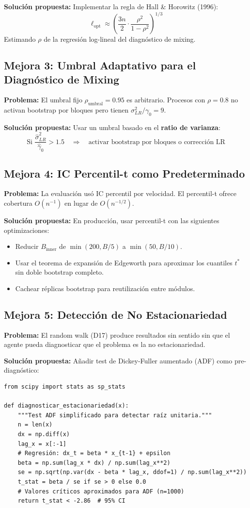 \documentclass[12pt,a4paper]{article}
\begin{document}
\textbf{Solución propuesta:} Implementar la regla de Hall \& Horowitz (1996):
\[
\ell_{\text{opt}} \approx \left( \frac{3n}{2} \cdot \frac{\rho^2}{1-\rho^2} \right)^{1/3}
\]
Estimando $\rho$ de la regresión log-lineal del diagnóstico de mixing.

\subsection{Mejora 3: Umbral Adaptativo para el Diagnóstico de Mixing}

\textbf{Problema:} El umbral fijo $\rho_{\text{umbral}} = 0.95$ es arbitrario. Procesos con $\rho = 0.8$ no activan bootstrap por bloques pero tienen $\sigma^2_{LR} / \gamma_0 = 9$.

\textbf{Solución propuesta:} Usar un umbral basado en el \textbf{ratio de varianza}:
\[
\text{Si } \frac{\hat{\sigma}^2_{LR}}{\hat{\gamma}_0} > 1.5 \quad \Rightarrow \quad \text{activar bootstrap por bloques o corrección LR}
\]

\subsection{Mejora 4: IC Percentil-t como Predeterminado}

\textbf{Problema:} La evaluación usó IC percentil por velocidad. El percentil-t ofrece cobertura $O(n^{-1})$ en lugar de $O(n^{-1/2})$.

\textbf{Solución propuesta:} En producción, usar percentil-t con las siguientes optimizaciones:
\begin{itemize}
    \item Reducir $B_{\text{inner}}$ de $\min(200, B/5)$ a $\min(50, B/10)$.
    \item Usar el teorema de expansión de Edgeworth para aproximar los cuantiles $t^*$ sin doble bootstrap completo.
    \item Cachear réplicas bootstrap para reutilización entre módulos.
\end{itemize}

\subsection{Mejora 5: Detección de No Estacionariedad}

\textbf{Problema:} El random walk (D17) produce resultados sin sentido sin que el agente pueda diagnosticar que el problema es la no estacionariedad.

\textbf{Solución propuesta:} Añadir test de Dickey-Fuller aumentado (ADF) como pre-diagnóstico:
\begin{lstlisting}
from scipy import stats as sp_stats

def diagnosticar_estacionariedad(x):
    """Test ADF simplificado para detectar raíz unitaria."""
    n = len(x)
    dx = np.diff(x)
    lag_x = x[:-1]
    # Regresión: dx_t = beta * x_{t-1} + epsilon
    beta = np.sum(lag_x * dx) / np.sum(lag_x**2)
    se = np.sqrt(np.var(dx - beta * lag_x, ddof=1) / np.sum(lag_x**2))
    t_stat = beta / se if se > 0 else 0.0
    # Valores críticos aproximados para ADF (n=1000)
    return t_stat < -2.86  # 95% CI
\end{lstlisting}
\end{document}

